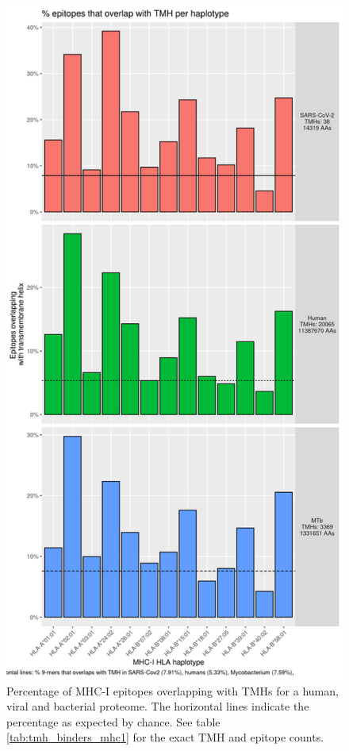 \begin{figure}[!htbp]
  \includegraphics[height=0.9\textheight]{bbbq_1_smart_results/fig_f_tmh_mhc1_2_grid.png}
  \caption{
    Percentage of MHC-I epitopes overlapping with TMHs
    for a human, viral and bacterial proteome.
    The horizontal lines indicate the percentage as expected by chance.
    See table \ref{tab:tmh_binders_mhc1} for the exact TMH and epitope counts.
  }
  \label{fig:1}
\end{figure}

